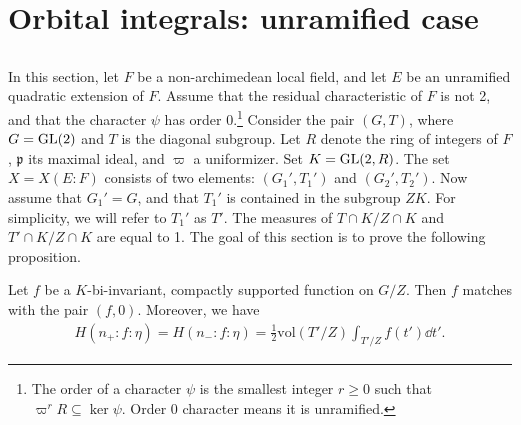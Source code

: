 \section{Orbital integrals: unramified case}

\subsection{}

In this section, let $F$ be a non-archimedean local field, and let $E$ be an unramified quadratic extension of $F$.
Assume that the residual characteristic of $F$ is not 2, and that the character $\psi$ has order 0.\footnote{The order of a character $\psi$ is the smallest integer $r \geq 0$ such that $\varpi^r R \subseteq \ker \psi$. Order 0 character means it is unramified.} 
Consider the pair $(G, T)$, where $G = \mathrm{GL}(2)$ and $T$ is the diagonal subgroup.
Let $R$ denote the ring of integers of $F$, $\mathfrak{p}$ its maximal ideal, and $\varpi$ a uniformizer.
Set $K = \mathrm{GL}(2, R)$. The set $X = X(E:F)$ consists of two elements: $(G_1', T_1')$ and $(G_2', T_2')$.
Now assume that $G_1' = G$, and that $T_1'$ is contained in the subgroup $ZK$.
For simplicity, we will refer to $T_1'$ as $T'$.
The measures of $T \cap K / Z \cap K$ and $T' \cap K / Z \cap K$ are equal to 1.
The goal of this section is to prove the following proposition.

\begin{proposition}\label{prop:5.1}
Let $f$ be a $K$-bi-invariant, compactly supported function on $G/Z$.
Then $f$ matches with the pair $(f, 0)$. Moreover, we have
\begin{align*}
    H(n_+: f: \eta) = H(n_-: f: \eta) = \frac{1}{2} \mathrm{vol}(T'/Z) \int_{T'/Z} f(t')\dd t'.
\end{align*}
\end{proposition}

